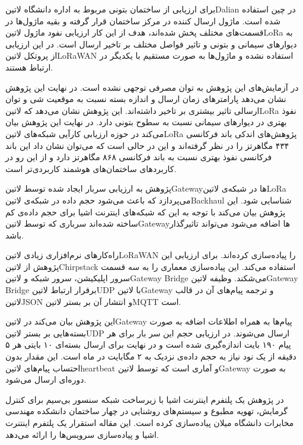 برای ارزیابی از ساختمان بتونی مربوط به اداره دانشگاه ‌لاتین{Dalian} در چین استفاده شده است. ماژول ارسال کننده در مرکز ساختمان قرار گرفته و بقیه ماژول‌ها
در قسمت‌های مختلف پخش شده‌اند، هدف از این کار ارزیابی نفود ماژول ‌لاتین{LoRa} به دیوارهای سیمانی و بتونی و تاثیر فواصل مختلف بر تاخیر ارسال است.
در این ارزیابی از پروتکل ‌لاتین{LoRaWAN} استفاده نشده و ماژول‌ها به صورت مستقیم با یکدیگر در ارتباط هستند.

در آزمایش‌های این پژوهش به توان مصرفی توجهی نشده است. در نهایت این پژوهش نشان می‌دهد پارامترهای زمان ارسال و اندازه بسته نسبت به موقعیت شی و توان ارسالی
تاثیر بیشتری بر تاخیر داشته‌اند. این پژوهش نشان می‌دهد که ‌لاتین{LoRa} نفوذ بهتری در دیوارهای سیمانی نسبت به سطوح بتونی دارد.
در نهایت این پژوهش بیان می‌کند در حوزه ارزیابی کارآیی شبکه‌های ‌لاتین{LoRa} پژوهش‌های اندکی باند فرکانسی ۴۳۴ مگاهرتز را در نظر گرفته‌اند و این در حالی است
که می‌توان نشان داد این باند فرکانسی نفوذ بهتری نسبت به باند فرکانسی ۸۶۸ مگاهرتز دارد و از این رو در کاربردهای ساختمان‌های هوشمند کاربردی‌تر است.


پژوهش  به ارزیابی سربار ایجاد شده توسط ‌لاتین{Gateway}ها در شبکه‌ی ‌لاتین{LoRa}
می‌پردازد که باعث می‌شود حجم داده در شبکه‌ی ‌لاتین{Backhaul} شناسایی شود.
این پژوهش بیان می‌کند با توجه به این که شبکه‌های اینترنت اشیا برای حجم داده‌ی کم ساخته شده‌اند سرباری که توسط ‌لاتین{Gateway}ها
اضافه می‌شود می‌تواند تاثیرگذار باشد.

راه‌کارهای نرم‌افزاری زیادی ‌لاتین{LoRaWAN} را پیاده‌سازی کرده‌اند.
برای ارزیابی این پژوهش از ‌لاتین{Chirpstack} استفاده می‌کند.
این پیاده‌سازی معماری را به سه قسمت سرور اپلیکیشن، سرور شبکه و ‌لاتین{Gateway Bridge}
می‌شکند.
وظیفه ‌لاتین{Gateway Bridge} برقرار ارتباط ‌لاتین{UDP} با ‌لاتین{Gateway} و ترجمه پیام‌های آن در قالب
‌لاتین{JSON} و انتشار آن بر بستر ‌لاتین{MQTT} است.

این پژوهش بیان می‌کند در ‌لاتین{Gateway} پیام‌ها به همراه اطلاعات اضافه به صورت بسته‌هایی بر بستر ‌لاتین{UDP} ارسال می‌شوند.
در ارزیابی حجم این سر بار برای هر پیام ۱۹۰ بایت اندازه‌گیری شده است و در نهایت برای ارسال بسته‌ای ۱۰ بایتی هر ۵ دقیقه از یک نود نیاز به
حجم داده‌ی نزدیک به ۲ مگابایت در ماه است. این مقدار بدون احتساب پیام‌های ‌لاتین{heartbeat} و آماری است که توسط ‌لاتین{Gateway}
به صورت دوره‌ای ارسال می‌شود.


در پژوهش  یک پلتفرم اینترنت اشیا با زیرساخت شبکه سنسور بی‌سیم برای کنترل گرمایش، تهویه مطبوع و سیستم‌های روشنایی در چهار ساختمان دانشکده
مهندسی مخابرات دانشگاه میلان پیاده‌سازی کرده است. این مقاله استقرار یک پلتفرم اینتنرت اشیا و پیاده‌سازی سرویس‌ها را ارائه می‌دهد.

